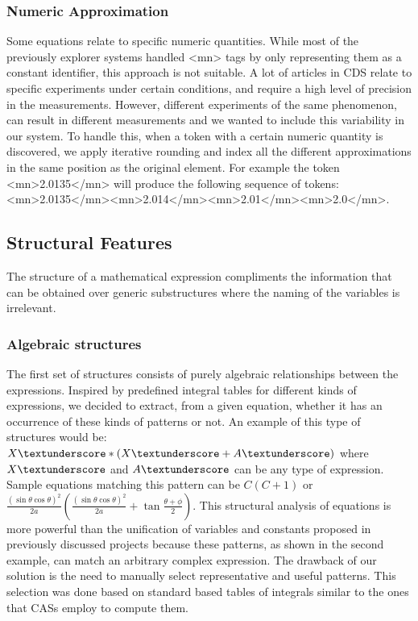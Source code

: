 \subsubsection{Numeric Approximation} 
Some equations relate to specific numeric quantities. While most of the previously explorer systems handled <mn> tags by only representing them as a constant identifier, this approach is not suitable. A lot of articles in CDS relate to specific experiments under certain conditions, and require a high level of precision in the measurements. However, different experiments of the same phenomenon, can result in different measurements and we wanted to include this variability in our system. To handle this, when a token with a certain numeric quantity is discovered, we apply iterative rounding and index all the different approximations in the same position as the original element. For example the token <mn>2.0135</mn> will produce the following sequence of tokens: <mn>2.0135</mn><mn>2.014</mn><mn>2.01</mn><mn>2.0</mn>. 


\subsection{Structural Features}
The structure of a mathematical expression compliments the information that can be obtained over generic substructures where the naming of the variables is irrelevant.  

\subsubsection{Algebraic structures}
The first set of structures consists of purely algebraic relationships between the expressions.
Inspired by predefined integral tables for different kinds of expressions, we decided to extract, from a given equation, whether it has an occurrence of these kinds of patterns or not.
An example of this type of structures would be: $X\textunderscore*(X\textunderscore + A\textunderscore)$ where $X\textunderscore$ and $A\textunderscore$ can be any type of expression. Sample equations matching this pattern can be $C (C+1)$ or $\frac{(\sin{\theta}\cos{\theta})^2}{2a} (\frac{(\sin{\theta}\cos{\theta})^2}{2a} + \tan{\frac{\theta+\phi}{2}})$. This structural analysis of equations is more powerful than the unification of variables and constants proposed in previously discussed projects because these patterns, as shown in the second example, can match an arbitrary complex expression. The drawback of our solution is the need to manually select representative and useful patterns. This selection was done based on standard based tables of integrals similar to the ones that CASs employ to compute them.

